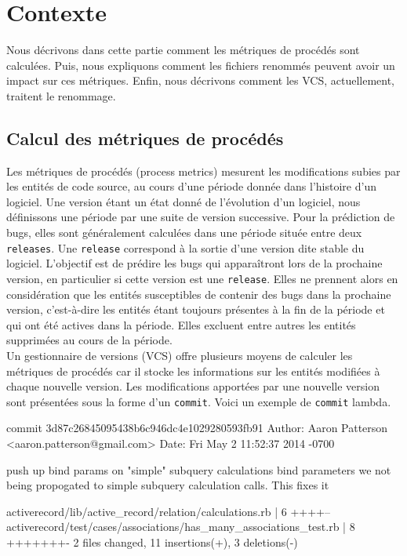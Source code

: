 \section{Contexte}
\label{sec:metriques}

Nous décrivons dans cette partie comment les métriques de procédés sont calculées. Puis, nous expliquons comment les fichiers renommés peuvent avoir un impact sur ces métriques. Enfin, nous décrivons comment les VCS, actuellement, traitent le renommage.

\subsection{Calcul des métriques de procédés}

Les métriques de procédés (process metrics) mesurent les modifications subies par les entités de code source, au cours d'une période donnée dans l'histoire d'un logiciel. Une version étant un état donné de l'évolution d'un logiciel, nous définissons une période par une suite de version successive. Pour la prédiction de bugs, elles sont généralement calculées dans une période située entre deux \texttt{releases}. Une \texttt{release} correspond à la sortie d'une version dite stable du logiciel. L'objectif est de prédire les bugs qui apparaîtront lors de la prochaine version, en particulier si cette version est une \texttt{release}. Elles ne prennent alors en considération que les entités susceptibles de contenir des bugs dans la prochaine version, c'est-à-dire les entités étant toujours présentes à la fin de la période et qui ont été actives dans la période. Elles excluent entre autres les entités supprimées au cours de la période.\\

Un gestionnaire de versions (VCS) offre plusieurs moyens de calculer les métriques de procédés car il stocke les informations sur les entités modifiées à chaque nouvelle version. Les modifications apportées par une nouvelle version sont présentées sous la forme d'un \texttt{commit}. Voici un exemple de \texttt{commit} lambda.\\

\begingroup
	\fontsize{8pt}{12pt}\selectfont
	\centering\begin{boxedverbatim}
	commit 3d87c26845095438b6c946dc4e1029280593fb91	
	Author: Aaron Patterson <aaron.patterson@gmail.com>
	Date:   Fri May 2 11:52:37 2014 -0700

	    push up bind params on "simple" subquery calculations 
	    bind parameters we not being propogated to simple subquery 
	    calculation calls. This fixes it

	 activerecord/lib/active_record/relation/calculations.rb            |    6 ++++--
	 activerecord/test/cases/associations/has_many_associations_test.rb |    8 +++++++-
	 2 files changed, 11 insertions(+), 3 deletions(-)
	\end{boxedverbatim}
\endgroup
\linebreak

